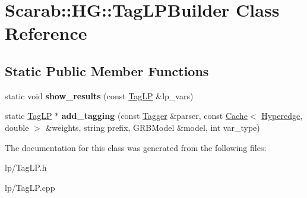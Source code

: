 \hypertarget{classScarab_1_1HG_1_1TagLPBuilder}{
\section{Scarab::HG::TagLPBuilder Class Reference}
\label{classScarab_1_1HG_1_1TagLPBuilder}
}
\subsection*{Static Public Member Functions}
\begin{DoxyCompactItemize}
\item 
\hypertarget{classScarab_1_1HG_1_1TagLPBuilder_aa4990c224df5a1c82220a655ee51bd73}{
static void {\bfseries show\_\-results} (const \hyperlink{structScarab_1_1HG_1_1TagLP}{TagLP} \&lp\_\-vars)}
\label{classScarab_1_1HG_1_1TagLPBuilder_aa4990c224df5a1c82220a655ee51bd73}

\item 
\hypertarget{classScarab_1_1HG_1_1TagLPBuilder_a9c0f3ee542cbbed34945b80932272cea}{
static \hyperlink{structScarab_1_1HG_1_1TagLP}{TagLP} $\ast$ {\bfseries add\_\-tagging} (const \hyperlink{classTagger}{Tagger} \&parser, const \hyperlink{classCache}{Cache}$<$ \hyperlink{classScarab_1_1HG_1_1Hyperedge}{Hyperedge}, double $>$ \&weights, string prefix, GRBModel \&model, int var\_\-type)}
\label{classScarab_1_1HG_1_1TagLPBuilder_a9c0f3ee542cbbed34945b80932272cea}

\end{DoxyCompactItemize}


The documentation for this class was generated from the following files:\begin{DoxyCompactItemize}
\item 
lp/TagLP.h\item 
lp/TagLP.cpp\end{DoxyCompactItemize}
